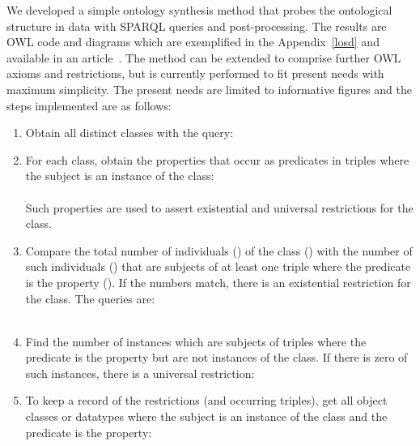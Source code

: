 We developed a simple ontology synthesis method that probes
the ontological structure in data with
SPARQL queries and post-processing.
The results are OWL code and diagrams which are 
exemplified in the Appendix~\ref{losd} and 
available in an article~\cite{losd}.
The method can be extended to comprise further OWL axioms and restrictions,
but is currently performed to fit present needs with maximum simplicity.
The present needs are limited to informative figures and
the steps implemented are as follows:
\begin{enumerate}[leftmargin=0cm]
	\item Obtain all distinct classes with the query:\\
	\item For each class, obtain the properties that occur as predicates in triples where the subject is an instance of the class:\\
		\\
		Such properties are used to assert existential and universal restrictions for the class.
	\item Compare the total number of individuals () of the class () with
		the number of such individuals () that are subjects of at least one triple where 
		the predicate is the property ().
		If the numbers match, there is an existential restriction for the class. The queries are:\\
		\\
	\item Find the number of instances which are subjects of triples where the predicate is the property but are not instances of the class.
		If there is zero of such instances, there is a universal restriction:\\
	\item To keep a record of the restrictions (and occurring triples), get all object classes or datatypes where the subject is an instance of the class and the predicate is the property:\\

\end{enumerate}
